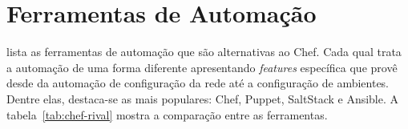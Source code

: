 \section{Ferramentas de Automação}
\label{sec:ferramenta_automacao}


 lista as ferramentas de automação que são alternativas ao
Chef. Cada qual trata a automação de uma forma diferente apresentando \textit{features} %
específica que provê desde da automação de configuração da rede até a configuração
de ambientes. Dentre elas, destaca-se as mais populares: Chef, Puppet,
SaltStack e Ansible. A tabela~\ref{tab:chef-rival} mostra a comparação entre
as ferramentas.

